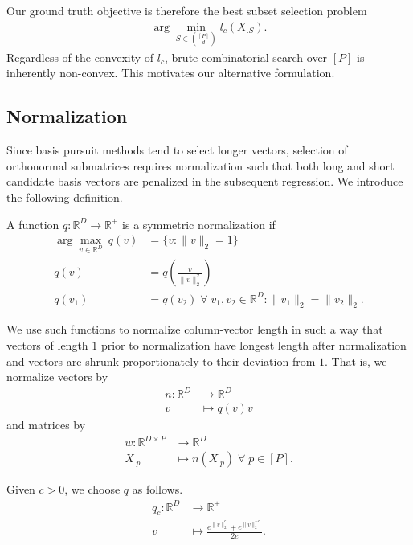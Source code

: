 Our ground truth objective is therefore the best subset selection problem
\begin{align}
\label{prog:ground_truth}
\arg \min_{ S \in \binom{[P]}{d}} l_c ( X_{. S}).
\end{align}
Regardless of the convexity of $l_c$, brute combinatorial search over $[P]$ is inherently non-convex.
This motivates our alternative formulation.

\subsection{Normalization}
\label{sec:normalization}

Since basis pursuit methods tend to select longer vectors, selection of orthonormal submatrices requires normalization such that both long and short candidate basis vectors are penalized in the subsequent regression.
We introduce the following definition.

\begin{definition}
A function $q: \mathbb R^D \to \mathbb R^+ $ is a symmetric normalization if 
\begin{align}
\arg \max_{v \in \mathbb R^D} \ q (v) &=\{ v : \|v\|_2 = 1 \} \\
q(v) &= q(\frac{v}{\|v\|_2^2}) \\
q(v_1) &= q(v_2) \; \forall \; v_1, v_2 \in \mathbb R^D : \|v_1\|_2 = \|v_2\|_2.
\end{align} \label{def:symmetric_normalization}
\end{definition}

We use such functions to normalize column-vector length in such a way that vectors of length $1$ prior to normalization have longest length after normalization and vectors are shrunk proportionately to their deviation from $1$. 
That is, we normalize vectors by 
\begin{align}
n: \mathbb R^D  &\to \mathbb R^D \\
v &\mapsto {q(v) }v
\end{align}
and matrices by
\begin{align}
w: \mathbb R^{D \times P}  &\to \mathbb R^D \\
 X_{.p} &\mapsto n( X_{.p}) \; \forall \; p \in [P].
\end{align}

Given $c > 0$, we choose $q$ as follows.
\begin{align}
q_c: \mathbb R^D  &\to \mathbb R^+ \\
v  &\mapsto \frac{e^{\|v\|_2^c} + e^{\|v\|_2^{-c}}}{2e}.
\label{eq:normalization}
\end{align}

